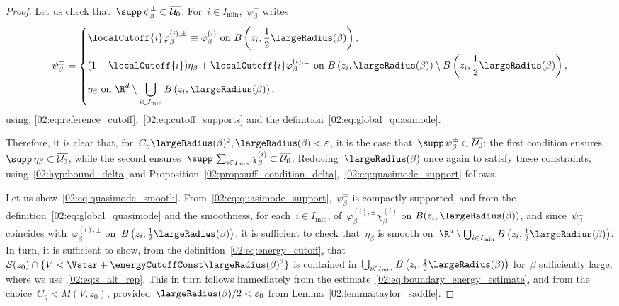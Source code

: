 \begin{proof}
                Let us check that~$\supp\,\psi_\beta^\pm \subset \overline{\mathcal U_0}$.
                For~$i\in I_{\min}$,~$\psi_\beta^\pm$ writes
                \[\psi_\beta^\pm = \left\{\begin{aligned}&\localCutoff{i}\varphi_\beta^{(i),\pm}\equiv\varphi_\beta^{(i)}\text{ on }B\left(z_i,\frac12\largeRadius(\beta)\right),\\&(1-\localCutoff{i})\eta_\beta + \localCutoff{i}\varphi_\beta^{(i),\pm}\text{ on }B\left(z_i,\largeRadius(\beta)\right)\setminus B\left(z_i,\frac12\largeRadius(\beta)\right),\\ &\eta_\beta\text{ on }\R^d \setminus \bigcup_{i\in I_{\min}} B\left(z_i,\largeRadius(\beta)\right),\end{aligned}\right.\]
                using, \eqref{02:eq:reference_cutoff},~\eqref{02:eq:cutoff_supports} and the definition~\eqref{02:eq:global_quasimode}.
                
                Therefore, it is clear that, for~$C_\eta\largeRadius(\beta)^2,\largeRadius(\beta) < \varepsilon$, it is the case that~$\supp\,\psi_\beta^\pm \subset \overline {\mathcal U_0}$:
                the first condition ensures~$\supp\,\eta_\beta\subset \overline{\mathcal U_0}$, while the second ensures~$\supp\,\sum_{i\in I_{\min}}\chi_\beta^{(i)}\subset \overline{\mathcal U_0}$.
                Reducing~$\largeRadius(\beta)$ once again to satisfy these constraints, using~\eqref{02:hyp:bound_delta} and Proposition~\ref{02:prop:suff_condition_delta},~\eqref{02:eq:quasimode_support} follows.

                Let us show~\eqref{02:eq:quasimode_smooth}.
                From~\eqref{02:eq:quasimode_support},~$\psi_\beta^\pm$ is compactly supported, and from the definition~\eqref{02:eq:global_quasimode} and the smoothness, for each~$i\in I_{\min}$, of~$\varphi_\beta^{(i),\pm}\chi_\beta^{(i)}$ on $B(z_i,\largeRadius(\beta))$, and since~$\psi_\beta^\pm$ coincides with~$\varphi_\beta^{(i),\pm}$ on~$B\left(z_i,\frac12\largeRadius(\beta)\right)$, it is sufficient to check that~$\eta_\beta$ is smooth on~$\R^d\setminus \bigcup_{i\in I_{\min}} B\left(z_i,\frac12\largeRadius(\beta)\right)$.
                In turn, it is sufficient to show, from the definition~\eqref{02:eq:energy_cutoff}, that~$\mathcal S(z_0)\cap\{V<\Vstar+\energyCutoffConst\largeRadius(\beta)^2\}$ is contained in~$\bigcup_{i\in I_{\min}} B\left(z_i,\frac12\largeRadius(\beta)\right)$ for~$\beta$ sufficiently large, where we use~\eqref{02:eq:s_alt_rep}. This in turn follows immediately from the estimate~\eqref{02:eq:boundary_energy_estimate}, and from the choice~$C_\eta<M(V,z_0)$, provided~$\largeRadius(\beta)/2<\varepsilon_0$ from Lemma~\ref{02:lemma:taylor_saddle}.
                

\end{proof}
